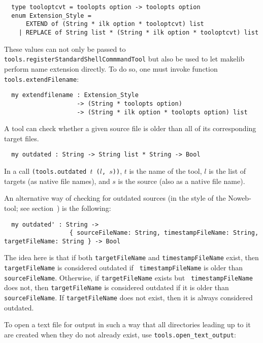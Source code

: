 \begin{verbatim}
  type tooloptcvt = toolopts option -> toolopts option
  enum Extension_Style =
      EXTEND of (String * ilk option * tooloptcvt) list
    | REPLACE of String list * (String * ilk option * tooloptcvt) list
\end{verbatim}

These values can not only be passed to {\tt
tools.registerStandardShellCommmandTool} but also be used to let makelib perform name
extension directly.  To do so, one must invoke function {\tt
tools.extendFilename}:

\begin{verbatim}
  my extendfilename : Extension_Style
                    -> (String * toolopts option)
                    -> (String * ilk option * toolopts option) list
\end{verbatim}

 A tool can check whether a given
source file is older than all of its corresponding target files.

\begin{verbatim}
  my outdated : String -> String list * String -> Bool
\end{verbatim}

In a call {\tt (tools.outdated $t$ ($l$, $s$))}, $t$ is the name of
the tool, $l$ is the list of targets (as native file names),
and $s$ is the source (also as a native file name).

An alternative way of checking for outdated sources (in the style of
the Noweb-tool; see section~) is the
following:

\begin{verbatim}
  my outdated' : String ->
                  { sourceFileName: String, timestampFileName: String, targetFileName: String } -> Bool
\end{verbatim}

The idea here is that if both {\tt targetFileName} and {\tt timestampFileName}
exist, then {\tt targetFileName} is considered outdated if {\tt
timestampFileName} is older than {\tt sourceFileName}.
Otherwise, if {\tt targetFileName} exists but {\tt
timestampFileName} does not, then {\tt targetFileName} is considered
outdated if it is older than {\tt sourceFileName}.
If {\tt targetFileName} does not exist, then it is always
considered outdated.

  To open a text file for
output in such a way that all directories leading up to it are created
when they do not already exist, use {\tt tools.open_text_output}:

